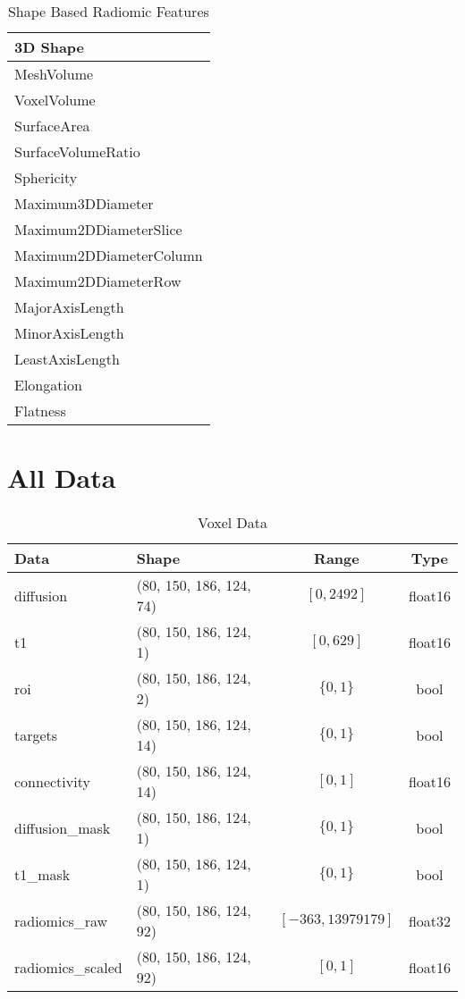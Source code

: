 \begin{table}[H]
\centering
\begin{tabular}{|l|}
\hline
\textbf{3D Shape} \\ \hline
MeshVolume \\ \hline
VoxelVolume \\ \hline
SurfaceArea \\ \hline
SurfaceVolumeRatio \\ \hline
Sphericity \\ \hline
Maximum3DDiameter \\ \hline
Maximum2DDiameterSlice \\ \hline
Maximum2DDiameterColumn \\ \hline
Maximum2DDiameterRow \\ \hline
MajorAxisLength \\ \hline
MinorAxisLength \\ \hline
LeastAxisLength \\ \hline
Elongation \\ \hline
Flatness \\ \hline
\end{tabular}
\caption{Shape Based Radiomic Features}
\label{tab:radf2}
\end{table}

\section{All Data}

\begin{table}[H]
\centering
\begin{tabular}{|l|l|c|c|}
\hline
\textbf{Data} & \textbf{Shape} & \textbf{Range} & \textbf{Type} \\ \hline
diffusion & (80, 150, 186, 124, 74) & $[0,2492]$ & float16 \\ \hline
t1 & (80, 150, 186, 124, 1) & $[0,629]$ & float16 \\ \hline
roi & (80, 150, 186, 124, 2) & $\{0,1\}$ & bool \\ \hline
targets & (80, 150, 186, 124, 14) & $\{0,1\}$ & bool \\ \hline
connectivity & (80, 150, 186, 124, 14) & $[0,1]$ & float16 \\ \hline
diffusion\_mask & (80, 150, 186, 124, 1) & $\{0,1\}$ & bool \\ \hline
t1\_mask & (80, 150, 186, 124, 1) & $\{0,1\}$ & bool \\ \hline
radiomics\_raw & (80, 150, 186, 124, 92) & $[-363,13979179]$ & float32 \\ \hline
radiomics\_scaled & (80, 150, 186, 124, 92) & $[0,1]$ & float16 \\ \hline
\end{tabular}
\caption{Voxel Data}
\label{tab:datasvox}
\end{table}

